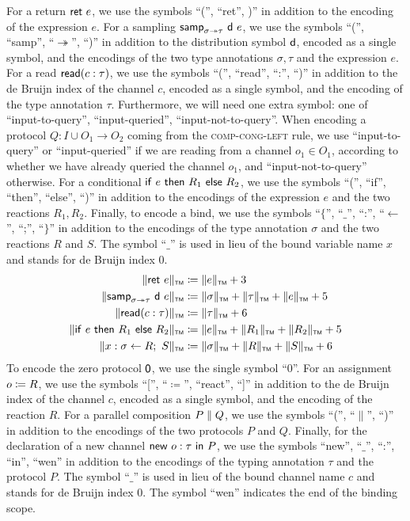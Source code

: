 For a return $\mathsf{ret} \ e$, we use the symbols \textsf{``(''}, \textsf{``ret''}, \textsf{)''} in addition to the encoding of the expression $e$. For a sampling $\mathsf{samp}_{\sigma \twoheadrightarrow \tau} \ \mathsf{d} \ e$, we use the symbols \textsf{``(''}, \textsf{``samp''}, \textsf{``$\twoheadrightarrow$''}, \textsf{``)''} in addition to the distribution symbol $\mathsf{d}$, encoded as a single symbol, and the encodings of the two type annotations $\sigma, \tau$ and the expression $e$. For a read $\mathsf{read}(c : \tau)$, we use the symbols \textsf{``(''}, \textsf{``read''}, \textsf{``:''}, \textsf{``)''} in addition to the de Bruijn index of the channel $c$, encoded as a single symbol, and the encoding of the type annotation $\tau$. Furthermore, we will need one extra symbol: one of \textsf{``input-to-query''}, \textsf{``input-queried''}, \textsf{``input-not-to-query''}. When encoding a protocol $Q : I \cup O_1 \to O_2$ coming from the \textsc{comp-cong-left} rule, we use \textsf{``input-to-query''} or \textsf{``input-queried''} if we are reading from a channel $o_1 \in O_1$, according to whether we have already queried the channel $o_1$, and \textsf{``input-not-to-query''} otherwise. For a conditional $\mathsf{if} \ e \ \mathsf{then} \ R_1 \ \mathsf{else} \ R_2$, we use the symbols \textsf{``(''}, \textsf{``if''}, \textsf{``then''}, \textsf{``else''}, \textsf{``)''} in addition to the encodings of the expression $e$ and the two reactions $R_1, R_2$. Finally, to encode a bind, we use the symbols \textsf{``$\{$''}, \textsf{``$\_$''}, \textsf{``:''}, \textsf{``$\leftarrow$''}, \textsf{``;''}, \textsf{``$\}$''} in addition to the encodings of the type annotation $\sigma$ and the two reactions $R$ and $S$. The symbol \textsf{``$\_$''} is used in lieu of the bound variable name $x$ and stands for de Bruijn index $0$.
\begin{align*}
\Vert \mathsf{ret} \ e \Vert_{\scriptscriptstyle \mathsf{TM}} & \coloneqq \Vert e \Vert_{\scriptscriptstyle \mathsf{TM}} + 3 \\
\Vert \mathsf{samp}_{\sigma \twoheadrightarrow \tau} \ \mathsf{d} \ e \Vert_{\scriptscriptstyle \mathsf{TM}} & \coloneqq \Vert \sigma \Vert_{\scriptscriptstyle \mathsf{TM}} + \Vert \tau \Vert_{\scriptscriptstyle \mathsf{TM}} + \Vert e \Vert_{\scriptscriptstyle \mathsf{TM}} + 5 \\
\Vert \mathsf{read}(c : \tau) \Vert_{\scriptscriptstyle \mathsf{TM}} & \coloneqq \Vert \tau \Vert_{\scriptscriptstyle \mathsf{TM}} + 6 \\
\Vert \mathsf{if} \ e \ \mathsf{then} \ R_1 \ \mathsf{else} \ R_2 \Vert_{\scriptscriptstyle \mathsf{TM}} & \coloneqq \Vert e \Vert_{\scriptscriptstyle \mathsf{TM}} + \Vert R_1 \Vert_{\scriptscriptstyle \mathsf{TM}} + \Vert R_2 \Vert_{\scriptscriptstyle \mathsf{TM}} + 5 \\
\Vert x : \sigma \leftarrow R; \ S \Vert_{\scriptscriptstyle \mathsf{TM}} & \coloneqq \Vert \sigma \Vert_{\scriptscriptstyle \mathsf{TM}} + \Vert R \Vert_{\scriptscriptstyle \mathsf{TM}} + \Vert S \Vert_{\scriptscriptstyle \mathsf{TM}} + 6
\end{align*}
To encode the zero protocol $\mathsf{0}$, we use the single symbol \textsf{``0''}. For an assignment $o \coloneqq R$, we use the symbols \textsf{``[''}, \textsf{``$\coloneqq$''}, \textsf{``react''}, \textsf{``]''} in addition to the de Bruijn index of the channel $c$, encoded as a single symbol, and the encoding of the reaction $R$. For a parallel composition $P \; \| \; Q$, we use the symbols \textsf{``(''}, \textsf{``$\|$''}, \textsf{``)''} in addition to the encodings of the two protocols $P$ and $Q$. Finally, for the declaration of a new channel $\mathsf{new} \ o : \tau \ \mathsf{in} \ P$, we use the symbols \textsf{``new''}, \textsf{``$\_$''}, \textsf{``:''}, \textsf{``in''}, \textsf{``wen''} in addition to the encodings of the typing annotation $\tau$ and the protocol $P$. The symbol \textsf{``$\_$''} is used in lieu of the bound channel name $c$ and stands for de Bruijn index $0$. The symbol \textsf{``wen''} indicates the end of the binding scope.
